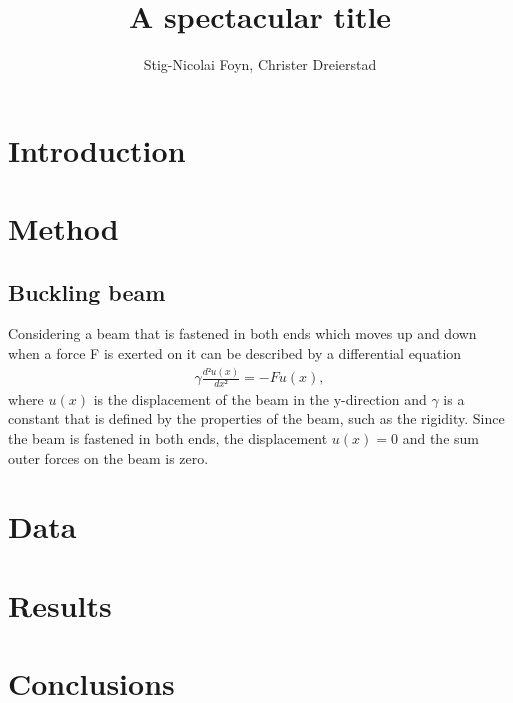 \documentclass{emulateapj}
\begin{document}
\title{A spectacular title}

\author{Stig-Nicolai Foyn, Christer Dreierstad}




\begin{abstract}
\end{abstract}

\section{Introduction}
\label{sec:introduction}



\section{Method}
\label{sec:method}
\subsection{Buckling beam}
Considering a beam that is fastened in both ends which moves up and down when a force F is exerted on it can be described by a differential equation
%
\begin{gather}
    \gamma \frac{d²u(x)}{dx²} = -Fu(x),
\end{gather}
%
where $u(x)$ is the displacement of the beam in the y-direction and $\gamma$ is a constant that is defined by the properties of the beam, such as the rigidity. Since the beam is fastened in both ends, the displacement $u(x) = 0$ and the sum outer forces on the beam is zero. 


\section{Data}
\label{sec:data}


\section{Results}
\label{sec:results}



\section{Conclusions}
\label{sec:conclusions}
\end{document}
